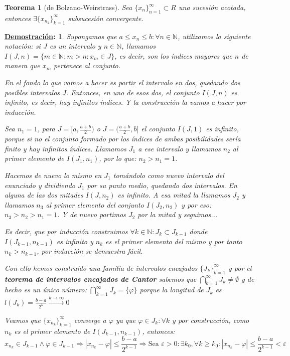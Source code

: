 \documentclass[10pt,a4paper,openright]{book}
\theoremstyle{break}
\newtheorem*{theo}{Teorema}
\newtheorem*{demo}{\underline{Demostración}:}
\begin{document}
\begin{theo}[de Bolzano-Weirstrass]
Sea $\{x_n\}_{n=1}^\infty\subset R$ una sucesión acotada, entonces $\exists \{x_{n_k}\}_{k=1}^\infty$ subsucesión convergente.
\end{theo}
\begin{demo}
Supongamos que $a\leq x_n\leq b: \forall n\in \mathbb N$, utilizamos la siguiente notación: si $J$ es un intervalo y $n\in \mathbb N$, llamamos $I(J,n)=\{m\in \mathbb N :m>n: x_m\in J\}$, es decir, son los índices mayores que $n$ de manera que $x_m$ pertenece al conjunto.\par

En el fondo lo que vamos a hacer es partir el intervalo en dos, quedando dos posibles intervalos $J$. Entonces, en uno de esos dos, el conjunto $I(J,n)$ es infinito, es decir, hay infinitos índices. Y la construcción la vamos a hacer por inducción.

Sea $n_1=1$, para $J=[a, \frac{a+b}{2})$ o $J=(\frac{a+b}{2},b]$ el conjunto $I(J,1)$ es infinito, porque si no el conjunto formado por los índices de ambas posibilidades sería finito y hay infinitos índices. Llamamos $J_1$ a ese intervalo y llamamos $n_2$ al primer elemento de $I(J_1,n_1)$, por lo que: $n_2>n_1=1$.\par

Hacemos de nuevo lo mismo en $J_1$ tomándolo como nuevo intervalo del enunciado y dividiendo $J_1$ por su punto medio, quedando dos intervalos. En alguna de las dos mitades $I(J, n_2)$ es infinito. A esa mitad la llamamos $J_2$ y llamamos $n_3$ al primer elemento del conjunto $I(J_2,n_2)$ y por eso: $n_3>n_2>n_1=1$. Y de nuevo partimos $J_2$ por la mitad y seguimos...\par

Es decir, que por inducción construimos $\forall k\in \mathbb N: J_k\subset J_{k-1}$ donde $I(J_{k-1},n_{k-1})$ es infinito y $n_{k}$ es el primer elemento del mismo y por tanto $n_k>n_{k-1}$, por inducción se demuestra fácil.\par

Con ello hemos construido una familia de intervalos encajados $\{J_k\}_{k=1}^\infty$ y por el \textbf{teorema de intervalos encajados de Cantor} sabemos que $\bigcap_{k=1}^\infty J_k\neq \emptyset$ y de hecho es un único número: $\bigcap_{k=1}^\infty J_k=\{\varphi\}$ porque la longitud de $J_k$ es $l(J_k)=\frac{b-a}{2^k}\xrightarrow{k\rightarrow \infty} 0$\par

Veamos que $\{x_{n_k}\}_{k=1}^\infty$ converge a $\varphi$ ya que $\varphi\in J_k: \forall k$ y por construcción, como $n_k$ es el primer elemento de $I(J_{k-1},n_{k-1})$, entonces:
$$x_{n_k}\in J_{k-1}\wedge \varphi\in J_{k-1}\Rightarrow \left|x_{n_k}-\varphi\right|\leq \frac{b-a}{2^{k-1}}\Rightarrow \mbox{Sea }\varepsilon>0:\exists k_0, \forall k\geq k_0 : \left|x_{n_k}-\varphi\right|\leq \frac{b-a}{2^{k-1}}<\varepsilon$$
\end{demo}
\end{document}
